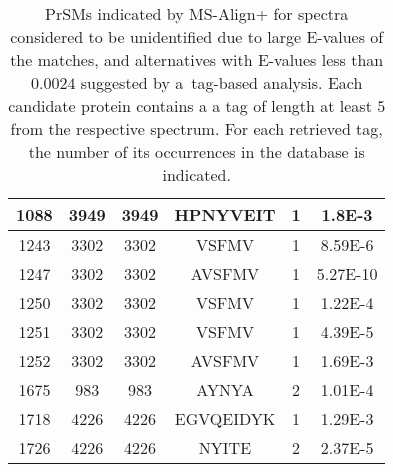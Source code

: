 \documentclass{article}[12pt]
\begin{document}
\begin{landscape}
\begin{table}[h]
{\begin{center}
\begin{tabular}{|c|c||c|c|c|c|}
  \hline
1088& 3949 & 
3949
 & 
HPNYVEIT & 1 & 1.8E-3\\
  \hline
1243& 3302 & 
3302
 & 
VSFMV & 1 & 8.59E-6\\
  \hline
1247& 3302 & 
3302
 & 
AVSFMV & 1 & 5.27E-10\\
  \hline
1250& 3302 & 
3302
 & 
VSFMV & 1 & 1.22E-4\\
  \hline
1251& 3302 & 
3302
 & 
VSFMV & 1 & 4.39E-5\\
  \hline
1252& 3302 & 
3302
 & 
AVSFMV & 1 & 1.69E-3\\
  \hline
1675& 983 & 
983
 & 
AYNYA & 2 & 1.01E-4\\
  \hline
1718& 4226 & 
4226
 & 
EGVQEIDYK & 1 & 1.29E-3\\
  \hline
1726& 4226 & 
4226
 & 
NYITE & 2 & 2.37E-5\\
\hline\end{tabular}
\end{center}
\par}
\centering
\caption{PrSMs indicated by MS-Align+ for spectra considered to be unidentified due to large E-values of the matches, and alternatives with E-values less than $0.0024$ suggested by a~tag-based analysis. Each candidate protein contains a a tag of length at least $5$ from the respective spectrum. For each retrieved tag, the number of its occurrences in the database is indicated.}
\vspace{3mm}
\label{table:unident-spectra}
\end{table}






\end{landscape}
\end{document}
